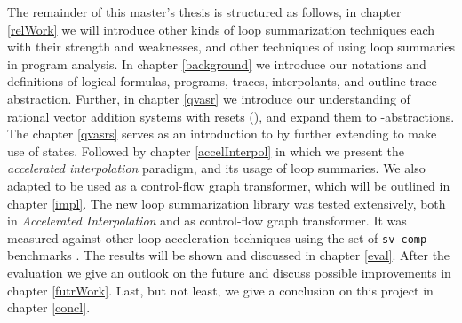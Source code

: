 The remainder of this master's thesis is structured as follows, in chapter \ref{relWork} we will introduce other kinds of loop summarization techniques each with their strength and weaknesses, and other techniques of using loop summaries in program analysis. In chapter \ref{background} we introduce our notations and definitions of logical formulas, programs, traces, interpolants, and outline trace abstraction. Further, in chapter \ref{qvasr} we introduce our understanding of rational vector addition systems with resets (\qvasr), and expand them to \qvasr-abstractions. The chapter \ref{qvasrs} serves as an introduction to \qvasrs by further extending \qvasr to make use of states. Followed by chapter \ref{accelInterpol} in which we present the \textsl{accelerated interpolation} paradigm, and its usage of \qvasr loop summaries. We also adapted \qvasr to be used as a control-flow graph transformer, which will be outlined in chapter \ref{impl}. The new loop summarization library was tested extensively, both in \textsl{Accelerated Interpolation} and as control-flow graph transformer. It was measured against other loop acceleration techniques using the set of \texttt{sv-comp} benchmarks \cite{svcomp}. The results will be shown and discussed in chapter \ref{eval}. After the evaluation we give an outlook on the future and discuss possible improvements in chapter \ref{futrWork}. Last, but not least, we give a conclusion on this project in chapter \ref{concl}.

